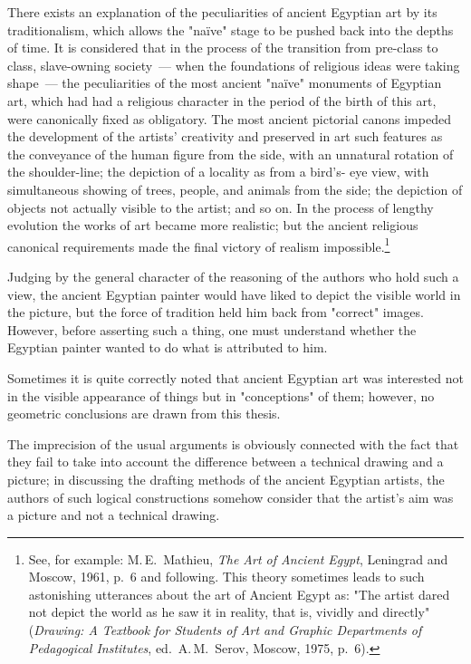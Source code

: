 There exists an explanation of the peculiarities of ancient Egyptian art by its
traditionalism, which allows the "naïve" stage to be pushed back into the depths of time.
It is considered that in the process of the transition from pre-class to class, slave-owning
society~--- when the foundations of religious ideas were taking shape~--- the peculiarities
of the most ancient "naïve" monuments of Egyptian art, which had had a religious
character in the period of the birth of this art, were canonically fixed as obligatory.
The most ancient pictorial canons impeded the development of the artists' creativity and
preserved in art such features as the conveyance of the human figure from the side, with
an unnatural rotation of the shoulder-line; the depiction of a locality as from a bird's-
eye view, with simultaneous showing of trees, people, and animals from the side;
the depiction of objects not actually visible to the artist; and so on. In the process of
lengthy evolution the works of art became more realistic; but the ancient religious
canonical requirements made the final victory of realism impossible.\footnote{%
  See, for example: M.\,E.~Mathieu, \textit{The Art of Ancient Egypt}, Leningrad and
  Moscow, 1961, p.~6 and following.
  This theory sometimes leads to such astonishing utterances about the art of Ancient
  Egypt as: "The artist dared not depict the world as he saw it in reality, that is, vividly
  and directly" (\textit{Drawing: A Textbook for Students of Art and Graphic
  Departments of Pedagogical Institutes}, ed.~A.\,M.~Serov, Moscow, 1975, p.~6).}


Judging by the general character of the reasoning of the authors who hold such a view,
the ancient Egyptian painter would have liked to depict the visible world in the picture,
but the force of tradition held him back from "correct" images. However, before asserting
such a thing, one must understand whether the Egyptian painter wanted to do what is
attributed to him.

Sometimes it is quite correctly noted that ancient Egyptian art was interested not in
the visible appearance of things but in "conceptions" of them; however, no geometric
conclusions are drawn from this thesis.

The imprecision of the usual arguments is obviously connected with the fact that they
fail to take into account the difference between a technical drawing and a picture; in
discussing the drafting methods of the ancient Egyptian artists, the authors of such
logical constructions somehow consider that the artist's aim was a picture and not a
technical drawing.

